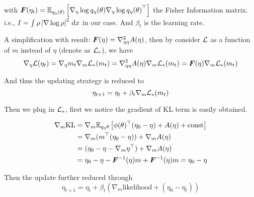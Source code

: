 \documentclass{article}
\begin{document}
with \(\boldsymbol{F}(\eta_t)=\mathbb{E}_{q_\eta(\theta)}\left[ \nabla_\eta\log q_\eta(\theta){\nabla_\eta\log q_\eta(\theta)}^\top \right]\) the Fisher Information matrix. i.e., \(I=\int \rho\left\vert\nabla\log \rho\right\vert^2\,\mathrm{d} x\) in our case. And \(\beta_t\) is the learning rate.

A simplification with result: \(\boldsymbol{F}(\eta)=\nabla_{\eta\eta}^2 A(\eta)\), then by consider \(\mathcal{L}\) as a function of \(m\) instead of \(\eta\) (denote as \(\mathcal{L}_*\)), we have
\begin{equation}
    \nabla_\eta \mathcal{L}(\eta_t)=\nabla_\eta m_t \nabla_m\mathcal{L}_*(m_t)=\nabla_{\eta\eta}^2 A(\eta)\nabla_m\mathcal{L}_*(m_t)=\boldsymbol{F}(\eta)\nabla_m\mathcal{L}_*(m_t)
\end{equation}

And thus the updating strategy is reduced to
\begin{equation}
    \eta_{t+1}=\eta_t+\beta_t\nabla_m\mathcal{L}_*(m_t)
\end{equation}

Then we plug in \(\mathcal{L}_*\), first we notice the gradient of KL term is easily obtained.

\begin{align*}
    \nabla_m \textrm{KL}&=\nabla_m\mathbb{E}_{q_\eta{\theta}}\left[ \phi(\theta)^\top(\eta_0-\eta)+A(\eta)+\textrm{const} \right]\\
    &=\nabla_m(m^\top(\eta_0-\eta))+\nabla_mA(\eta)\\
    &=(\eta_0-\eta-\nabla_m\eta^\top)+\nabla_mA(\eta)\\
    &= \eta_0-\eta-\boldsymbol{F}^{-1}(\eta)m+\boldsymbol{F}^{-1}(\eta)m = \eta_0-\eta
\end{align*}

Then the update further reduced through
\begin{equation}
    \eta_{t+1}=\eta_t+\beta_t(\nabla_m\textrm{likelihood}+(\eta_0-\eta_t))
\end{equation}
\end{document}
